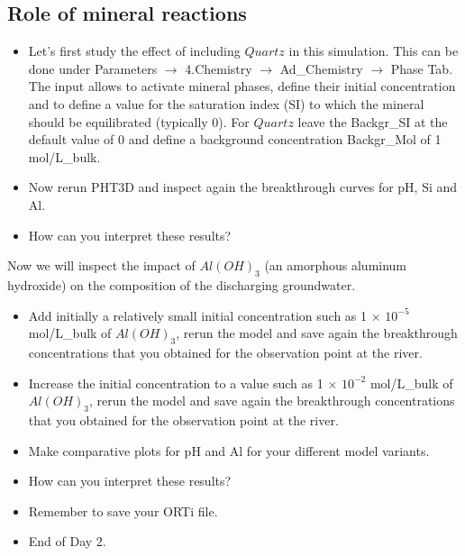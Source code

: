 \subsection[Role of mineral reactions]{Role of mineral reactions}

\begin{itemize}

\item Let's first study the effect of including $Quartz$ in this simulation. 
This can be done under 
{\color{blue}Parameters} $\rightarrow$ 
{\color{blue}4.Chemistry} $\rightarrow$ 
{\color{blue}Ad\_Chemistry} $\rightarrow$ 
{\color{blue}Phase} Tab. 
The input allows to activate mineral phases, define their initial concentration 
and to define a value for the saturation index (SI) to which the mineral 
should be equilibrated (typically 0).
For $Quartz$ leave the {\color{blue}Backgr\_SI} at the default value of 0 and define a background 
concentration {\color{blue}Backgr\_Mol} of 1 mol/L\_bulk. 

\item Now rerun PHT3D and inspect again the breakthrough curves for pH, Si and Al.

\item How can you interpret these results?  

\end{itemize}

Now we will inspect the impact of $Al(OH)_3$ (an amorphous aluminum hydroxide) 
on the composition of the discharging groundwater.

\begin{itemize}

\item Add initially a relatively small initial concentration such as 1 $\times$ $10^{-5}$ mol/L\_bulk 
of $Al(OH)_3$, rerun the model and save again the breakthrough concentrations that you obtained for the observation point at the river.

\item Increase the initial concentration to a value 
such as 1 $\times$ $10^{-2}$ mol/L\_bulk 
of $Al(OH)_3$, rerun the model and save again the breakthrough 
concentrations that you obtained for the observation point at the river.

\item Make comparative plots for pH and Al for your different model variants. 

\item How can you interpret these results?

\item Remember to save your ORTi file.

\item End of Day 2.


\end{itemize}

